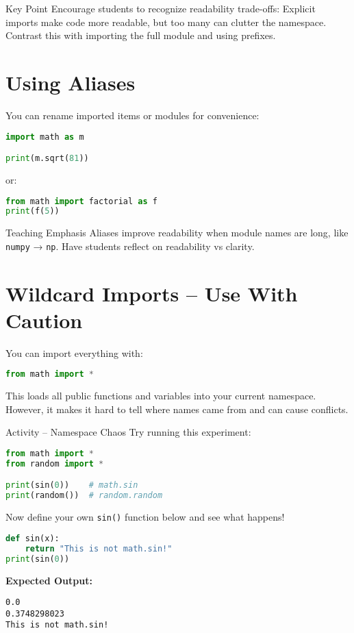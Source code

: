 \documentclass[12pt]{article}
\begin{document}
\begin{teacherbox}{Key Point}
Encourage students to recognize readability trade-offs:  
Explicit imports make code more readable, but too many can clutter the namespace.  
Contrast this with importing the full module and using prefixes.
\end{teacherbox}

\section{Using Aliases}

You can rename imported items or modules for convenience:

\begin{lstlisting}[language=Python]
import math as m

print(m.sqrt(81))
\end{lstlisting}

or:

\begin{lstlisting}[language=Python]
from math import factorial as f
print(f(5))
\end{lstlisting}

\begin{teacherbox}{Teaching Emphasis}
Aliases improve readability when module names are long, like \texttt{numpy} → \texttt{np}.  
Have students reflect on readability vs clarity.
\end{teacherbox}

\section{Wildcard Imports – Use With Caution}
You can import everything with:
\begin{lstlisting}[language=Python]
from math import *
\end{lstlisting}

This loads all public functions and variables into your current namespace.  
However, it makes it hard to tell where names came from and can cause conflicts.

\begin{activitybox}{Activity – Namespace Chaos}
Try running this experiment:

\begin{lstlisting}[language=Python]
from math import *
from random import *

print(sin(0))    # math.sin
print(random())  # random.random
\end{lstlisting}

Now define your own \texttt{sin()} function below and see what happens!
\begin{lstlisting}[language=Python]
def sin(x):
    return "This is not math.sin!"
print(sin(0))
\end{lstlisting}

\textbf{Expected Output:}
\begin{lstlisting}
0.0
0.3748298023
This is not math.sin!
\end{lstlisting}
\end{activitybox}
\end{document}
